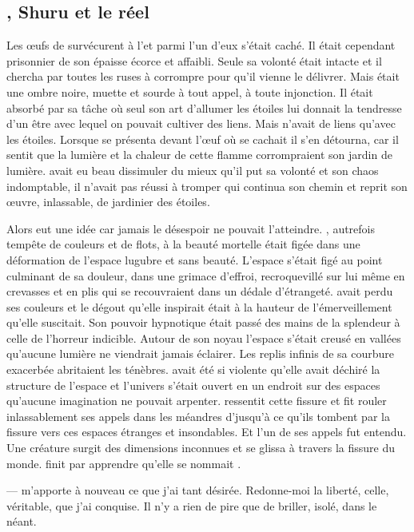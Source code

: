 \subsection{\Ogo, Shuru et le réel}

Les œufs de \Tot survécurent à l'\Extinction et parmi l'un d'eux \Ogo s'était caché. Il était cependant prisonnier de son épaisse écorce et affaibli. Seule sa volonté était intacte et il chercha par toutes les ruses à corrompre \Carac pour qu'il vienne le délivrer. Mais \Carac était une ombre noire, muette et sourde à tout appel, à toute injonction. Il était absorbé par sa tâche où seul son art d'allumer les étoiles lui donnait la tendresse d'un être avec lequel on pouvait cultiver des liens. Mais \Carac n'avait de liens qu'avec les étoiles. Lorsque \Carac se présenta devant l'œuf où \Ogo se cachait il s'en détourna, car il sentit que la lumière et la chaleur de cette flamme corrompraient son jardin de lumière. \Ogo avait eu beau dissimuler du mieux qu'il put sa volonté et son chaos indomptable, il n'avait pas réussi à tromper \Carac qui continua son chemin et reprit son œuvre, inlassable, de jardinier des étoiles. 

Alors \Ogo eut une idée car jamais le désespoir ne pouvait l'atteindre. \Auga, autrefois tempête de couleurs et de flots, à la beauté mortelle était figée dans une déformation de l'espace lugubre et sans beauté. L'espace s'était figé au point culminant de sa douleur, dans une grimace d'effroi, recroquevillé sur lui même en crevasses et en plis qui se recouvraient dans un dédale d'étrangeté. \Auga avait perdu ses couleurs et le dégout qu'elle inspirait était à la hauteur de l'émerveillement qu'elle suscitait. Son pouvoir hypnotique était passé des mains de la splendeur à celle de l'horreur indicible. Autour de son noyau l'espace s'était creusé en vallées qu'aucune lumière ne viendrait jamais éclairer. Les replis infinis de sa courbure exacerbée abritaient les ténèbres. \Auga avait été si violente qu'elle avait déchiré la structure de l'espace et l'univers s'était ouvert en un endroit sur des espaces qu'aucune imagination ne pouvait arpenter. \Ogo ressentit cette fissure et fit rouler inlassablement ses appels dans les méandres d'\Auga jusqu'à ce qu'ils tombent par la fissure vers ces espaces étranges et insondables. Et l'un de ses appels fut entendu. Une créature surgit des dimensions inconnues et se glissa à travers la fissure du monde. \Ogo finit par apprendre qu'elle se nommait \Shuru.

--- \Auga m'apporte à nouveau ce que j'ai tant désirée. Redonne-moi la liberté, celle, véritable, que j'ai conquise. Il n'y a rien de pire que de briller, isolé, dans le néant. \n

